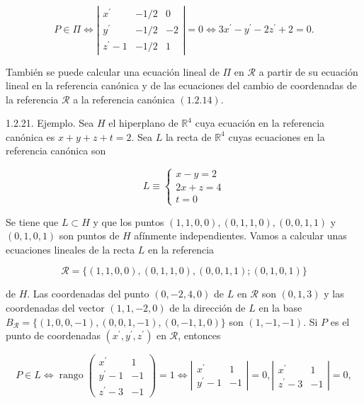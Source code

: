 \documentclass[12pt, a4paper, ones, notitlepage, openany,titlepage]{article}
\begin{document}
$$
P \in \Pi \Longleftrightarrow\left|\begin{array}{ccr}
x^{\prime} & -1 / 2 & 0 \\
y^{\prime} & -1 / 2 & -2 \\
z^{\prime}-1 & -1 / 2 & 1
\end{array}\right|=0 \Longleftrightarrow 3 x^{\prime}-y^{\prime}-2 z^{\prime}+2=0 .
$$

También se puede calcular una ecuación lineal de $\Pi$ en $\mathcal{R}$ a partir de su ecuación lineal en la referencia canónica y de las ecuaciones del cambio de coordenadas de la referencia $\mathcal{R}$ a la referencia canónica $(1.2 .14)$.

1.2.21. Ejemplo. Sea $H$ el hiperplano de $\mathbb{R}^{4}$ cuya ecuación en la referencia canónica es $x+y+z+t=2$. Sea $L$ la recta de $\mathbb{R}^{4}$ cuyas ecuaciones en la referencia canónica son

$$
L \equiv\left\{\begin{array}{l}
x-y=2 \\
2 x+z=4 \\
t=0
\end{array}\right.
$$

Se tiene que $L \subset H$ y que los puntos $(1,1,0,0),(0,1,1,0),(0,0,1,1)$ y $(0,1,0,1)$ son puntos de $H$ afínmente independientes. Vamos a calcular unas ecuaciones lineales de la recta $L$ en la referencia

$$
\mathcal{R}=\{(1,1,0,0),(0,1,1,0),(0,0,1,1) ;(0,1,0,1)\}
$$

de $H$. Las coordenadas del punto $(0,-2,4,0)$ de $L$ en $\mathcal{R}$ son $(0,1,3)$ y las coordenadas del vector $(1,1,-2,0)$ de la dirección de $L$ en la base $B_{\mathcal{R}}=\{(1,0,0,-1),(0,0,1,-1),(0,-1,1,0)\}$ son $(1,-1,-1)$. Si $P$ es el punto de coordenadas $\left(x^{\prime}, y^{\prime}, z^{\prime}\right)$ en $\mathcal{R}$, entonces

$$
P \in L \Longleftrightarrow \operatorname{rango}\left(\begin{array}{cc}
x^{\prime} & 1 \\
y^{\prime}-1 & -1 \\
z^{\prime}-3 & -1
\end{array}\right)=1 \Longleftrightarrow\left|\begin{array}{cr}
x^{\prime} & 1 \\
y^{\prime}-1 & -1
\end{array}\right|=0,\left|\begin{array}{cr}
x^{\prime} & 1 \\
z^{\prime}-3 & -1
\end{array}\right|=0,
$$
\end{document}
